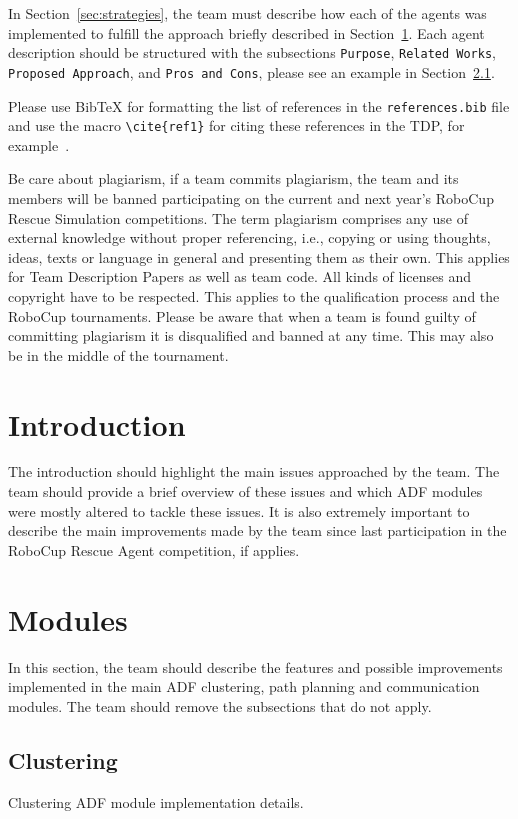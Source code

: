 \documentclass[runningheads,a4paper]{llncs}
\begin{document}
In Section~\ref{sec:strategies}, the team must describe how each of the agents was implemented to fulfill the approach briefly described in Section~\ref{sec:intro}. Each agent description should be structured with the subsections \texttt{Purpose}, \texttt{Related Works}, \texttt{Proposed Approach}, and \texttt{Pros and Cons}, please see an example in Section~\ref{sec:clustering}.

Please use BibTeX for formatting the list of references in the \texttt{references.bib} file and use the macro \texttt{\textbackslash cite\{ref1\}} for citing these references in the TDP, for example~\cite{ref1}.

Be care about plagiarism, if a team commits plagiarism, the team and its members will be banned participating on the current and next year's RoboCup Rescue Simulation competitions. The term plagiarism comprises any use of external knowledge without proper referencing, i.e., copying or using thoughts, ideas, texts or language in general and presenting them as their own. This applies for Team Description Papers as well as team code. All kinds of licenses and copyright have to be respected. This applies to the qualification process and the RoboCup tournaments. Please be aware that when a team is found guilty of committing plagiarism it is disqualified and banned at any time. This may also be in the middle of the tournament.
\section{Introduction}
\label{sec:intro}
The introduction should highlight the main issues approached by the team. The team should provide a brief overview of these issues and which ADF modules were mostly altered to tackle these issues. It is also extremely important to describe the main improvements made by the team since last participation in the RoboCup Rescue Agent competition, if applies.
\section{Modules}
\label{sec:modules}
In this section, the team should describe the features and possible improvements implemented in the main ADF clustering, path planning and communication modules. The team should remove the subsections that do not apply.
\subsection{Clustering}
\label{sec:clustering}
Clustering ADF module implementation details.
\end{document}
